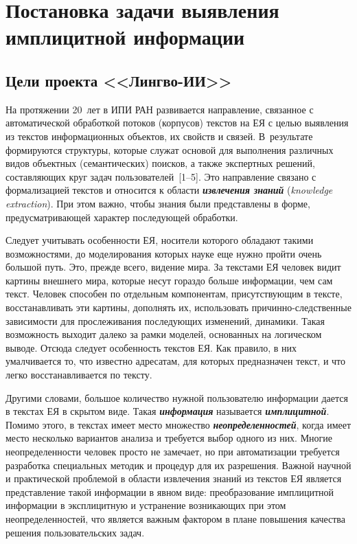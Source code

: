      \begin{multicols}{2}

            \label{st\stat}


\section{Постановка задачи выявления имплицитной информации}

\subsection{Цели проекта <<Лингво-ИИ>>}

     На протяжении 20~лет в ИПИ РАН развивается направление, связанное с 
автоматической обработкой потоков (корпусов) текстов на ЕЯ 
с целью выявления из текстов информационных объектов, их свойств и 
связей. В~результате формируются структуры, которые служат основой для 
выполнения различных видов объектных (семантических) поисков, а также 
экспертных решений, составляющих круг задач пользователей~[1--5]. Это 
направление связано с формализацией текстов и относится к области 
{\bfseries\textit{извлечения знаний}} (\textit{knowledge extraction}). При этом 
важно, чтобы знания были представлены в форме, предусматривающей 
характер последующей обработки. 
     
     Следует учитывать особенности ЕЯ, носители которого обладают такими 
возможностями, до моделирования которых науке еще нужно пройти очень 
большой путь. Это, прежде всего, видение мира. За текстами ЕЯ человек видит 
картины внешнего мира, которые несут гораздо больше информации, чем сам 
текст. Человек способен по отдельным компонентам, присутствующим в 
тексте, вос\-ста\-нав\-ли\-вать эти картины, дополнять их, использовать 
при\-чин\-но-след\-ст\-вен\-ные зависимости для прослеживания последующих изменений, 
динамики. Такая возможность выходит далеко за рамки моделей, основанных 
на логическом выводе. Отсюда следует особенность текстов ЕЯ. Как правило, в 
них умалчивается то, что известно адресатам, для которых предназначен текст, 
и что легко восстанавливается по тексту. 
     
     Другими словами, большое количество нужной пользователю 
информации дается в текстах ЕЯ в скрытом виде. Такая 
{\bfseries\textit{информация}} называется {\bfseries\textit{имплицитной}}. 
Помимо этого, в текстах имеет место множество 
{\bfseries\textit{неопределенностей}}, когда имеет место несколько вариантов 
анализа и требуется выбор одного из них. Многие неопределенности человек 
просто не замечает, но при автоматизации требуется разработка специальных 
методик и процедур для их разрешения. Важной научной и практической 
проблемой в области извлечения знаний из текстов ЕЯ является представление 
такой информации в явном виде: преобразование имплицитной информации в 
эксплицитную и устранение возникающих при этом неопределенностей, что 
является важным фактором в плане повышения качества решения 
пользовательских задач. 


\end{multicols}
